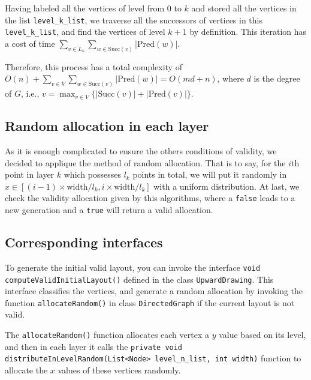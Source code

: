 Having labeled all the vertices of level from $0$ to $k$ and stored all the vertices in the list \lstinline{level_k_list}, we traverse all the successors of vertices in this \lstinline{level_k_list}, and find the vertices of level $k+1$ by definition. This iteration has a cost of time $\sum_{v\in L_k}\sum_{w\in \text{Succ}(v)} |\text{Pred}(w)|$. 

Therefore, this process has a total complexity of $O(n) + \sum_{v\in V}\sum_{w\in \text{Succ}(v)} |\text{Pred}(w)| = O(md + n)$, where $d$ is the degree of $G$, i.e., $v = \max_{v\in V} \{|\text{Succ}(v)| + |\text{Pred}(v)|\}$.


\subsection{Random allocation in each layer}
As it is enough complicated to ensure the others conditions of validity, we decided to applique the method of random allocation. 
That is to say, for the $i$th point in layer $k$ which possesses $l_k$ points in total, we will put it randomly in $x\in{[(i-1)\times{\text{width}/l_k},i\times{\text{width}/l_k}]}$ with a uniform distribution. At last, we check the validity allocation given by this algorithms, where a \lstinline{false} leads to a new generation and a \lstinline{true} will return a valid allocation. 

\subsection{Corresponding interfaces}
To generate the initial valid layout, you can invoke the interface \lstinline{void computeValidInitialLayout()} defined in the class \lstinline{UpwardDrawing}. This interface classifies the vertices, and generate a random allocation by invoking the function \lstinline{allocateRandom()} in class \lstinline{DirectedGraph} if the current layout is not valid. 

The \lstinline{allocateRandom()} function allocates each vertex a $y$ value based on its level, and then in each layer it calls the \lstinline{private void distributeInLevelRandom(List<Node> level_n_list, int width)} function to allocate the $x$ values of these vertices randomly. 


